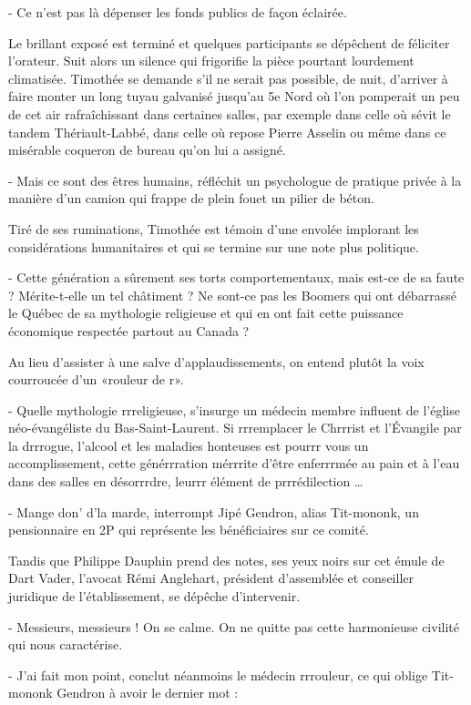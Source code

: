 - Ce n’est pas là dépenser les fonds publics de façon éclairée.

Le brillant exposé est terminé et quelques participants se dépêchent de féliciter l’orateur. Suit alors un silence qui frigorifie la pièce pourtant lourdement climatisée. Timothée se demande s’il ne serait pas possible, de nuit, d’arriver à faire monter un long tuyau galvanisé jusqu’au 5e Nord où l’on pomperait un peu de cet air rafraîchissant dans certaines salles, par exemple dans celle où sévit le tandem Thériault-Labbé, dans celle où repose Pierre Asselin ou même dans ce misérable coqueron de bureau qu’on lui a assigné.

- Mais ce sont des êtres humains, réfléchit un psychologue de pratique privée à la manière d’un camion qui frappe de plein fouet un pilier de béton.

Tiré de ses ruminations, Timothée est témoin d’une envolée implorant les considérations humanitaires et qui se termine sur une note plus politique.

- Cette génération a sûrement ses torts comportementaux, mais est-ce de sa faute ? Mérite-t-elle un tel châtiment ? Ne sont-ce pas les Boomers qui ont débarrassé le Québec de sa mythologie religieuse et qui en ont fait cette puissance économique respectée partout au Canada ?

Au lieu d’assister à une salve d’applaudissements, on entend plutôt la voix courroucée d’un «rouleur de r».

- Quelle mythologie rrreligieuse, s’insurge un médecin membre influent de l’église néo-évangéliste du Bas-Saint-Laurent. Si rrremplacer le Chrrrist et l’Évangile par la drrrogue, l’alcool et les maladies honteuses est pourrr vous un accomplissement, cette générrration mérrrite d’être enferrrmée au pain et à l’eau dans des salles en désorrrdre, leurrr élément de prrrédilection …

- Mange don’ d’la marde, interrompt Jipé Gendron, alias Tit-mononk, un pensionnaire en 2P qui représente les bénéficiaires sur ce comité.

Tandis que Philippe Dauphin prend des notes, ses yeux noirs sur cet émule de Dart Vader, l’avocat Rémi Anglehart, président d’assemblée et conseiller juridique de l’établissement, se dépêche d’intervenir.

- Messieurs, messieurs ! On se calme. On ne quitte pas cette harmonieuse civilité qui nous caractérise.

- J’ai fait mon point, conclut néanmoins le médecin rrrouleur, ce qui oblige Tit-mononk Gendron à avoir le dernier mot :

